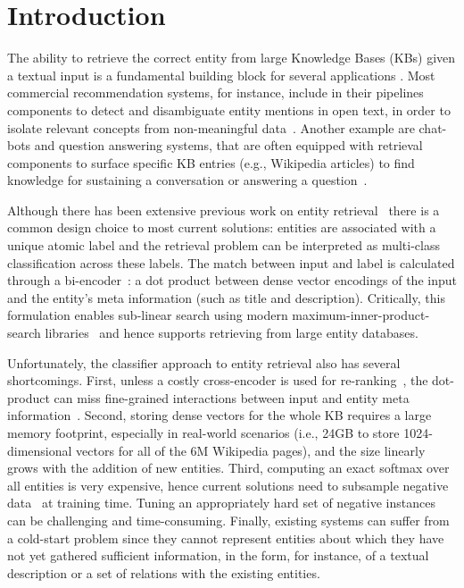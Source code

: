 \documentclass{article} \usepackage{main,times}
\begin{document}
\section{Introduction}

The ability to retrieve the correct entity from large Knowledge Bases (KBs) given a textual input is a fundamental building block for several applications \citep{ferrucci2012introduction,slawski_2015,yang-etal-2018-collective}. Most commercial recommendation systems, for instance, include in their pipelines components to detect and disambiguate entity mentions in open text, in order to isolate relevant concepts from non-meaningful data~\citep{slawski_2015,yang-etal-2018-collective}.
Another example are chat-bots and question answering systems, that are often equipped with retrieval components to surface specific KB entries (e.g., Wikipedia articles) to find knowledge for sustaining a conversation or answering a question~\citep{ferrucci2012introduction,chen2017reading,lewis2020retrievalaugmented,roller2020recipes}. 

Although there has been extensive previous work on entity retrieval~\citep[e.g.][to name just a few]{hoffart-etal-2011-robust,10.1145/2633211.2634350,huang2015leveraging, le-titov-2018-improving,logeswaran2019zero,broscheit-2019-investigating,wu-etal-2020-scalable} there is a common design choice to most current solutions: entities are associated with a unique atomic label and the retrieval problem can be interpreted as multi-class classification across these labels. The match between input and label is calculated through a bi-encoder~\citep{wu-etal-2020-scalable,karpukhin2020dense}: a dot product between dense vector encodings of the input and the entity's meta information (such as title and description). Critically, this formulation enables sub-linear search using modern maximum-inner-product-search libraries~\citep{johnson2019billion} and hence supports retrieving from large entity databases.    

Unfortunately, the classifier approach to entity retrieval also has several shortcomings.
First, unless a costly cross-encoder is used for re-ranking~\citep{wu-etal-2020-scalable}, the dot-product can miss fine-grained interactions between input and entity meta information~\citep{humeau2019poly}. 
Second, storing dense vectors for the whole KB requires a large memory footprint, especially in real-world scenarios (i.e., 24GB to store 1024-dimensional vectors for all of the 6M Wikipedia pages), and the size linearly grows with the addition of new entities.
Third, computing an exact softmax over all entities is very expensive, hence current solutions need to subsample negative data~\citep{logeswaran2019zero,karpukhin2020dense} at training time. Tuning an appropriately hard set of negative instances can be challenging and time-consuming. 
Finally, existing systems can suffer from a cold-start problem since they cannot represent entities about which they have not yet gathered sufficient information, in the form, for instance, of a textual description or a set of relations with the existing entities. 
\end{document}
